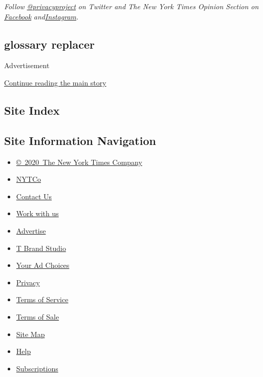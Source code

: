 \emph{Follow}
\href{https://twitter.com/privacyproject}{\emph{@privacyproject}}
\emph{on Twitter and The New York Times Opinion Section on}
\href{https://www.facebookcorewwwi.onion/nytopinion}{\emph{Facebook}}
\emph{and}\href{https://www.instagram.com/nytopinion/}{\emph{Instagram}}\emph{.}

\hypertarget{glossary-replacer}{%
\subsection{glossary replacer}\label{glossary-replacer}}

Advertisement

\protect\hyperlink{after-bottom}{Continue reading the main story}

\hypertarget{site-index}{%
\subsection{Site Index}\label{site-index}}

\hypertarget{site-information-navigation}{%
\subsection{Site Information
Navigation}\label{site-information-navigation}}

\begin{itemize}
\tightlist
\item
  \href{https://help.nytimes3xbfgragh.onion/hc/en-us/articles/115014792127-Copyright-notice}{©~2020~The
  New York Times Company}
\end{itemize}

\begin{itemize}
\tightlist
\item
  \href{https://www.nytco.com/}{NYTCo}
\item
  \href{https://help.nytimes3xbfgragh.onion/hc/en-us/articles/115015385887-Contact-Us}{Contact
  Us}
\item
  \href{https://www.nytco.com/careers/}{Work with us}
\item
  \href{https://nytmediakit.com/}{Advertise}
\item
  \href{http://www.tbrandstudio.com/}{T Brand Studio}
\item
  \href{https://www.nytimes3xbfgragh.onion/privacy/cookie-policy\#how-do-i-manage-trackers}{Your
  Ad Choices}
\item
  \href{https://www.nytimes3xbfgragh.onion/privacy}{Privacy}
\item
  \href{https://help.nytimes3xbfgragh.onion/hc/en-us/articles/115014893428-Terms-of-service}{Terms
  of Service}
\item
  \href{https://help.nytimes3xbfgragh.onion/hc/en-us/articles/115014893968-Terms-of-sale}{Terms
  of Sale}
\item
  \href{https://spiderbites.nytimes3xbfgragh.onion}{Site Map}
\item
  \href{https://help.nytimes3xbfgragh.onion/hc/en-us}{Help}
\item
  \href{https://www.nytimes3xbfgragh.onion/subscription?campaignId=37WXW}{Subscriptions}
\end{itemize}
